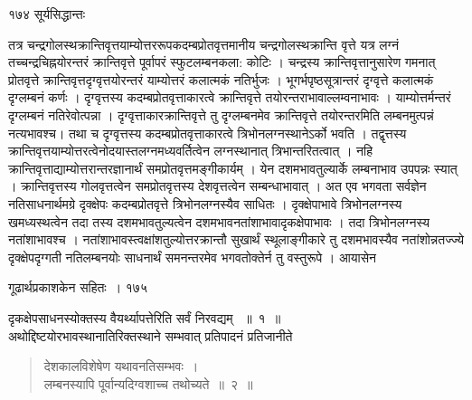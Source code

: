 \documentclass[11pt, openany]{book}
\begin{document}
\newpage


\noindent  १७४ \hspace{4cm} सूर्यसिद्धान्तः
\vspace{1cm}

\begin{sloppypar}
\noindent तत्र चन्द्रगोलस्थक्रान्तिवृत्तयाम्योत्तररूपकदम्बप्रोतवृत्तमानीय चन्द्रगोलस्थक्रान्ति वृत्ते यत्र लग्नं तच्चन्द्रचिह्नयोरन्तरं क्रान्तिवृत्ते पूर्वापरं स्फुटलम्बनकला: कोटिः । चन्द्रस्य क्रान्तिवृत्तानुसारेण गमनात् प्रोतवृत्ते क्रान्तिवृत्तदृग्वृत्तयोरन्तरं याम्योत्तरं कलात्मकं नतिर्भुजः । भूगर्भपृष्ठसूत्रान्तरं दृग्वृत्ते कलात्मकं दृग्लम्बनं कर्णः । दृग्वृत्तस्य कदम्बप्रोतवृत्ताकारत्वे क्रान्तिवृत्ते तयोरन्तराभावाल्लम्वनाभावः । याम्योत्तर्मन्तरं दृग्लम्बनं नतिरेवोत्पन्ना । दृग्वृत्ताकारक्रान्तिवृत्ते तु दृग्लम्बनमेव क्रान्तिवृत्ते तयोरन्तरमिति लम्बनमुत्पन्नं नत्यभावश्च। तथा च दृग्वृत्तस्य कदम्बप्रोतवृत्ताकारत्वे त्रिभोनलग्नस्थानेऽर्को भवति । तद्वृत्तस्य क्रान्तिवृत्तयाम्योत्तरत्वेनोदयास्तलग्नमध्यवर्तित्वेन लग्नस्थानात् त्रिभान्तरितत्वात् । नहि क्रान्तिवृत्ताद्याम्योत्तरान्तरज्ञानार्थं समप्रोतवृत्तमङ्गीकार्यम् । येन दशमभावतुल्यार्के लम्बनाभाव उपपन्नः स्यात् । क्रान्तिवृत्तस्य गोलवृत्तत्वेन समप्रोतवृत्तस्य देशवृत्तत्वेन सम्बन्धाभावात् । अत एव भगवता सर्वज्ञेन नतिसाधनार्थमग्रे दृक्क्षेपः कदम्बप्रोतवृत्ते त्रिभोनलग्नस्यैव साधितः । दृक्क्षेपाभावे त्रिभोनलग्नस्य खमध्यस्थत्वेन तदा तस्य दशमभावतुल्यत्वेन दशमभावनतांशाभावादृकक्षेपाभावः । तदा त्रिभोनलग्नस्य नतांशाभावश्च । नतांशाभावस्त्वक्षांशतुल्योत्तरक्रान्तौ सुखार्थं स्थूलाङ्गीकारे तु दशमभावस्यैव नतांशोन्नतज्ज्ये दृक्क्षेपदृग्गती नतिलम्बनयोः साधनार्थं समनन्तरमेव भगवतोक्तेर्न तु वस्तुरूपे । आयासेन
\end{sloppypar}

\newpage


\hspace{3cm} गूढार्थप्रकाशकेन सहितः~। \hfill १७५
\vspace{1cm}

\begin{sloppypar}
दृकक्षेपसाधनस्योक्तस्य वैयर्थ्यापत्तेरिति सर्वं निरवद्यम् ~॥~१~॥\\ 
अथोद्दिष्टयोरभावस्थानातिरिक्तस्थाने सम्भवात् प्रतिपादनं प्रतिजानीते\textendash
\end{sloppypar}


\begin{quote}
  {\ssi देशकालविशेषेण यथावनतिसम्भवः~।\\
लम्बनस्यापि पूर्वान्यदिग्वशाच्च तथोच्यते~॥~२~॥}
\end{quote}
\end{document}
